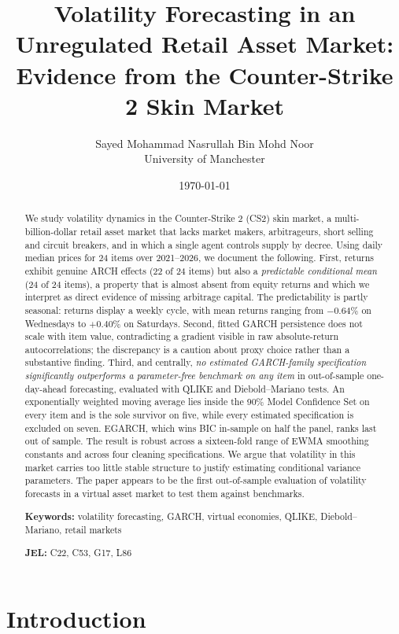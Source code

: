 \documentclass[11pt,a4paper]{article}
\title{\textbf{Volatility Forecasting in an Unregulated Retail Asset Market:}\\[0.3em]
\large Evidence from the Counter-Strike 2 Skin Market}
\author{Sayed Mohammad Nasrullah Bin Mohd Noor\\
\small University of Manchester}
\date{\today}
\begin{document}
\maketitle

\begin{abstract}
\noindent
We study volatility dynamics in the Counter-Strike 2 (CS2) skin market, a
multi-billion-dollar retail asset market that lacks market makers, arbitrageurs,
short selling and circuit breakers, and in which a single agent controls supply
by decree. Using daily median prices for 24 items over 2021--2026, we document
the following. First, returns exhibit genuine ARCH effects (22 of 24 items) but
also a \emph{predictable conditional mean} (24 of 24 items), a property that is
almost absent from equity returns and which we interpret as direct evidence of
missing arbitrage capital. The predictability is partly seasonal: returns
display a weekly cycle, with mean returns ranging from $-0.64\%$ on Wednesdays
to $+0.40\%$ on Saturdays. Second, fitted GARCH persistence does not scale with
item value, contradicting a gradient visible in raw absolute-return
autocorrelations; the discrepancy is a caution about proxy choice rather than a
substantive finding. Third, and centrally, \emph{no estimated GARCH-family
specification significantly outperforms a parameter-free benchmark on any item}
in out-of-sample one-day-ahead forecasting, evaluated with QLIKE and
Diebold--Mariano tests. An exponentially weighted moving average lies inside
the 90\% Model Confidence Set on every item and is the sole survivor on five,
while every estimated specification is excluded on seven. EGARCH, which wins
BIC in-sample on half the panel, ranks last out of sample. The result is robust
across a sixteen-fold range of EWMA smoothing constants and across four
cleaning specifications. We argue that volatility in this market carries too
little stable structure to justify estimating conditional variance parameters.
The paper appears to be the first out-of-sample evaluation of volatility
forecasts in a virtual asset market to test them against benchmarks.

\medskip
\noindent\textbf{Keywords:} volatility forecasting, GARCH, virtual economies,
QLIKE, Diebold--Mariano, retail markets

\noindent\textbf{JEL:} C22, C53, G17, L86
\end{abstract}

\section{Introduction}
\end{document}

